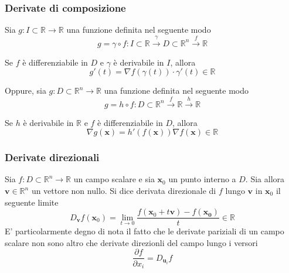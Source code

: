 \documentclass{article}
\begin{document}
        \subsubsection{Derivate di composizione}
            Sia $g: I \subset \mathbb{R} \rightarrow \mathbb{R}$ una funzione definita nel seguente modo
            \[
                g = \gamma \circ f: I \subset \mathbb{R} \xrightarrow{\gamma} D \subset \mathbb{R}^{n} \xrightarrow{f} \mathbb{R}
            \]
            
            Se $f$ è differenziabile in $D$ e $\gamma$ è derivabile in $I$, allora
            \[
                g'(t) = \nabla f(\gamma(t)) \cdot \gamma'(t) \in \mathbb{R}
            \]

            Oppure, sia $g: D \subset \mathbb{R}^{n} \rightarrow \mathbb{R}$ una funzione definita nel seguente modo
            \[
                g = h \circ f : D \subset \mathbb{R}^{n} \xrightarrow{f} \mathbb{R} \xrightarrow{h} \mathbb{R}
            \]

            Se $h$ è derivabile in $\mathbb{R}$ e $f$ è differenziabile in $D$, allora
            \[
                \nabla g(\mathbf{x}) = h'(f(\mathbf{x})) \nabla f(\mathbf{x}) \in \mathbb{R}
            \]
        
        \subsubsection{Derivate direzionali}
            Sia $f: D \subset \mathbb{R}^{n} \rightarrow \mathbb{R}$ un campo scalare e sia $\mathbf{x}_0$ un punto interno a $D$. Sia allora $\mathbf{v} \in \mathbb{R}^{n}$ un vettore non nullo. Si dice derivata direzionale
            di $f$ lungo $\mathbf{v}$ in $\mathbf{x}_0$ il seguente limite
            \[
                D_{\mathbf{v}} f(\mathbf{x}_0) = \lim_{t \rightarrow 0} \frac{f(\mathbf{x}_0 + t \mathbf{v}) - f(\mathbf{x_0})}{t} \in \mathbb{R}
            \]
            E' particolarmente degno di nota il fatto che le derivate pariziali di un campo scalare non sono altro che derivate direzionli del campo lungo i versori
            \[
                \frac{\partial f} {\partial x_i} = D_{\mathbf{u}_i} f
            \]
\end{document}
